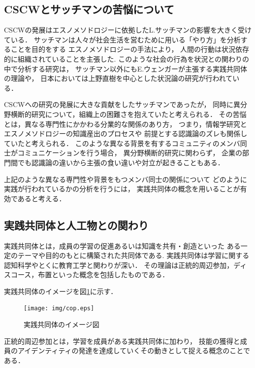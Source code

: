 \documentclass[submit,techrep]{ipsj}
\begin{document}
\subsection{CSCWとサッチマンの苦悩について}
CSCWの発展はエスノメソドロジーに依拠したL.サッチマンの影響を大きく受けている．
サッチマンは人々が社会生活を営むために用いる「やり方」を分析することを目的をする
エスノメソドロジー\cite{book3}の手法により，
人間の行動は状況依存的に組織されていることを主張した\cite{book4}.
このような社会の行為を状況との関わりの中で分析する研究は，
サッチマン以外にもE.ウェンガーが主張する実践共同体\cite{book5}の理論や，
日本においては上野直樹を中心とした状況論の研究が行われている\cite{book6}．

CSCWへの研究の発展に大きな貢献をしたサッチマンであったが，
同時に異分野横断的研究について，組織上の困難さを抱えていたと考えられる\cite{book7}．
その苦悩とは，異なる専門性にかかわる分業的な関係のあり方，
つまり，情報学研究とエスノメソドロジーの知識産出のプロセスや
前提とする認識論のズレも関係していたと考えられる\cite{book8}．
このような異なる背景を有するコミュニティのメンバ同士がコミュニケーションを行う場合，
異分野横断的研究に関わらず，
企業の部門間でも認識論の違いから主張の食い違いや対立が起きることもある\cite{book9}．

上記のような異なる専門性や背景をもつメンバ同士の関係について
どのように実践が行われているかの分析を行うには，
実践共同体の概念を用いることが有効であると考える．

\subsection{実践共同体と人工物との関わり}


実践共同体とは，成員の学習の促進あるいは知識を共有・創造といった
ある一定のテーマや目的のもとに構築された共同体である.
実践共同体は学習に関する認知科学やとくに教育工学と関わりが深い．
その理論は正統的周辺参加，ディスコース，布置といった概念を包括したものである．

実践共同体のイメージを図\ref{cop}に示す．
\begin{figure}[h]
  \centering
  \texttt{[image: img/cop.eps]}
  \caption{実践共同体のイメージ図}
  \label{cop}
\end{figure}
正統的周辺参加とは，学習を成員がある実践共同体に加わり，
技能の獲得と成員のアイデンティティの発達を達成していくその動きとして捉える概念のことである．
\end{document}
